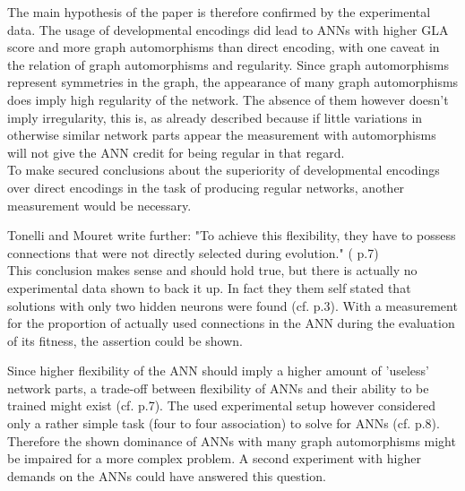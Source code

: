 \documentclass[12pt,twoside]{article}
\theoremstyle{plain}
\theoremstyle{definition}
\theoremstyle{remark}
\begin{document}
The main hypothesis of the paper is therefore confirmed by the experimental data. The usage of developmental encodings did lead to ANNs with higher GLA score and more graph automorphisms than direct encoding, with one caveat in the relation of graph automorphisms and regularity. Since graph automorphisms represent symmetries in the graph, the appearance of many graph automorphisms does imply high regularity of the network. The absence of them however doesn't imply irregularity, this is, as already described because if little variations in otherwise similar network parts appear the measurement with automorphisms will not give the ANN credit for being regular in that regard.\\
To make secured conclusions about the superiority of developmental encodings over direct encodings in the task of producing regular networks, another measurement would be necessary. \medskip

Tonelli and Mouret write further: "To achieve this flexibility, they have to possess connections that were not directly selected during evolution." (\cite{citeulike:12788284} p.7)\\
This conclusion makes sense and should hold true, but there is actually no experimental data shown to back it up. In fact they them self stated that solutions with only two hidden neurons were found (cf. \cite{citeulike:12788284} p.3).
With a measurement for the proportion of actually used connections in the ANN during the evaluation of its fitness, the assertion could be shown.\medskip

Since higher flexibility of the ANN should imply a higher amount of 'useless' network parts, a trade-off between flexibility of ANNs and their ability to be trained might exist (cf. \cite{citeulike:12788284} p.7).
The used experimental setup however considered only a rather simple task (four to four association) to solve for ANNs (cf. \cite{citeulike:12788284} p.8).
Therefore the  shown dominance of ANNs with many graph automorphisms might be impaired for a more complex problem. A second experiment with higher demands on the ANNs could have answered this question.\medskip
 
\end{document}
